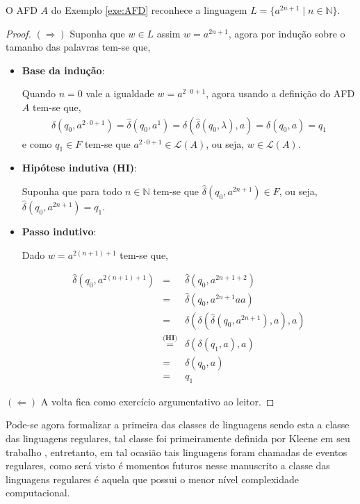 \begin{exem}
	O AFD $A$ do Exemplo \ref{exe:AFD} reconhece a linguagem $L = \{a^{2n + 1} \mid n \in \mathbb{N}\}$.
	\begin{proof}
		$(\Rightarrow)$ Suponha que $w \in L$ assim $w = a^{2n+1}$, agora por indução sobre o tamanho das palavras tem-se que, 
		
		\begin{itemize}
			\item \textbf{Base da indução}:
			
			Quando $n = 0$ vale a igualdade $w = a^{2\cdot 0+1}$, agora usando a definição do AFD $A$ tem-se que, 
			\begin{eqnarray*}
				\widehat{\delta}(q_0, a^{2\cdot 0+1}) = \widehat{\delta}(q_0, a^{1}) = \delta(\widehat{\delta}(q_0, \lambda), a) = \delta(q_0, a) = q_1
			\end{eqnarray*}
			e como $q_1 \in F$ tem-se que $a^{2\cdot 0+1} \in \mathcal{L}(A)$, ou seja, $w \in \mathcal{L}(A)$.
			
			\item \textbf{Hipótese indutiva (HI)}:
			
			Suponha que para todo $n \in \mathbb{N}$ tem-se que $\widehat{\delta}(q_0, a^{2n+1}) \in F$, ou seja, $\widehat{\delta}(q_0, a^{2n+1}) = q_1$.
			
			\item \textbf{Passo indutivo}:
			
			Dado $w = a^{2(n+1)+1}$ tem-se que,
			
			\begin{eqnarray*}
				\widehat{\delta}(q_0, a^{2(n+1)+1}) & = & \widehat{\delta}(q_0, a^{2n+1+2})\\
				& = & \widehat{\delta}(q_0, a^{2n+1}aa)\\
				& = & \delta(\delta(\widehat{\delta}(q_0, a^{2n+1}), a), a)\\
				& \stackrel{\textbf{(HI)}}{=} & \delta(\delta(q_1, a), a)\\
				& = & \delta(q_0, a)\\
				& = & q_1
			\end{eqnarray*}
		\end{itemize}
		$(\Leftarrow)$ A volta fica como exercício argumentativo ao leitor.
	\end{proof}
\end{exem}

Pode-se agora formalizar a primeira das classes de linguagens sendo esta a classe das linguagens regulares, tal classe foi primeiramente definida por Kleene em seu trabalho \cite{kleene1951}, entretanto, em tal ocasião tais linguagens foram chamadas de eventos regulares, como será visto é momentos futuros nesse manuscrito a classe das linguagens regulares é aquela que possui o menor nível complexidade computacional.

